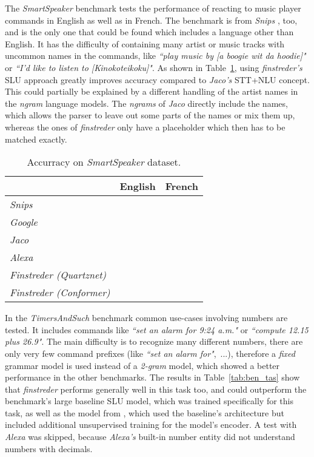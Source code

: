 \documentclass[a4paper]{article}
\begin{document}
\vspace{9pt}
The \textit{SmartSpeaker} benchmark tests the performance of reacting to music player commands in English as well as in French. The benchmark is from \textit{Snips} \cite{SNSLU}, too, and is the only one that could be found which includes a language other than English. It has the difficulty of containing many artist or music tracks with uncommon names in the commands, like \textit{``play music by [a boogie wit da hoodie]"} or \textit{``I'd like to listen to [Kinokoteikoku]"}. As shown in Table~\ref{tab:ben_ssc}, using \textit{finstreder's} SLU approach greatly improves accuracy compared to \textit{Jaco's} STT+NLU concept. This could partially be explained by a different handling of the artist names in the \textit{ngram} language models. The \textit{ngrams} of \textit{Jaco} directly include the names, which allows the parser to leave out some parts of the names or mix them up, whereas the ones of \textit{finstreder} only have a placeholder which then has to be matched exactly.

\begin{table}[htb]
	\footnotesize
	\caption{Accurracy on \textit{SmartSpeaker} dataset.}
	\vspace{-5pt}
	\label{tab:ben_ssc}
	\centering
	\begin{tabular}{lcc}
		\toprule
		\textbf{} & \textbf{English} & \textbf{French} \\
		\midrule
		\textit{Snips}~\cite{SNSLU} &  &  \\
		\textit{Google}~\cite{SNSLU} &  &  \\
		\textit{Jaco}~\cite{JACO} &  &  \\
		\textit{Alexa}~\cite{JACO} &  &  \\
		\textit{Finstreder (Quartznet)} &  &  \\
		\textit{Finstreder (Conformer)} &  &  \\
		\bottomrule
	\end{tabular}
\end{table}

\vspace{9pt}
In the \textit{TimersAndSuch} benchmark \cite{TIASU} common use-cases involving numbers are tested. It includes commands like  \textit{``set an alarm for 9:24 a.m."} or \textit{``compute 12.15 plus 26.9"}. The main difficulty is to recognize many different numbers, there are only very few command prefixes (like \textit{``set an alarm for"},~...), therefore a \textit{fixed} grammar model is used instead of a \textit{2-gram} model, which showed a better performance in the other benchmarks. The results in Table~\ref{tab:ben_tas} show that \textit{finstreder} performs generally well in this task too, and could outperform the benchmark's large baseline SLU model, which was trained specifically for this task, as well as the model from \cite{TASSB}, which used the baseline's architecture but included additional unsupervised training for the model's encoder. A test with \textit{Alexa} was skipped, because \textit{Alexa's} built-in number entity did not understand numbers with decimals.
\end{document}
